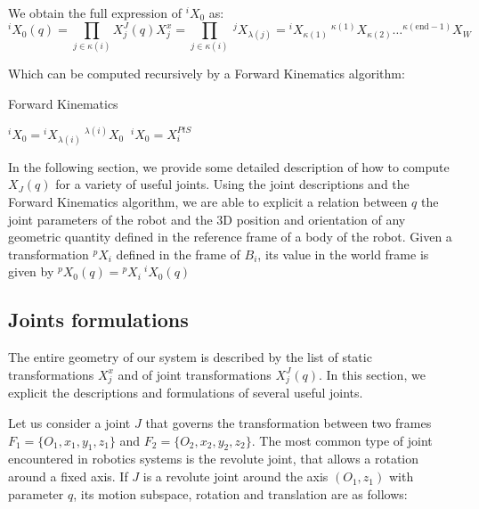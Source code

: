 We obtain the full expression of ${}^i X_0$ as:
\begin{equation}
  {}^i X_0 (q) = \prod_{j\in\kappa (i)}X^J_j (q) X^x_j = \prod_{j\in\kappa (i)}\ {}^j X_{\lambda (j)}
  = {}^i X_{\kappa (1)}\ ^{\kappa (1)}X_{\kappa (2)} \dots ^{\kappa (\text{end}-1)}X_{W}
\end{equation}

Which can be computed recursively by a Forward Kinematics algorithm:

\begin{algorithm}
  \caption{Forward Kinematics}
\label{alg:FK}
\begin{algorithmic}
   ${}^i X_0 = {}^i X_{\lambda (i)}\ ^{\lambda (i)}X_0$
  \Else$\ {}^i X_0 = X^{PtS}_i$
  \EndIf{}
  \EndFor{}
\end{algorithmic}
\end{algorithm}

In the following section, we provide some detailed description of how to compute $X_J (q)$ for a variety of useful joints.
Using the joint descriptions and the Forward Kinematics algorithm, we are able to explicit a relation between $q$ the joint parameters of the robot and the 3D position and orientation of  any geometric quantity defined in the reference frame of a body of the robot.
Given a transformation ${}^p X_i$ defined in the frame of $B_i$, its value in the world frame is given by ${}^p X_0 (q) = {}^p X_i\ {}^i X_0 (q)$



\subsection{Joints formulations}
\label{sub:joints_formulations}


The entire geometry of our system is described by the list of static transformations $X^x_j$ and of joint transformations $X^J_j (q)$.
In this section, we explicit the descriptions and formulations of several useful joints.

Let us consider a joint $J$ that governs the transformation between two frames $F_1=\{O_1, x_1, y_1, z_1\}$ and $F_2=\{O_2, x_2, y_2, z_2\}$.
The most common type of joint encountered in robotics systems is the revolute joint, that allows a rotation around a fixed axis.
If $J$ is a revolute joint around the axis $(O_1,z_1)$ with parameter $q$, its motion subspace, rotation and translation are as follows:

